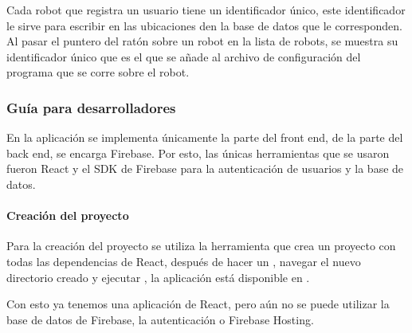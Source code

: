 Cada robot que registra un usuario tiene un identificador único, este identificador
le sirve para escribir en las ubicaciones den la base de datos que le corresponden.
Al pasar el puntero del ratón sobre un robot en la lista de robots, se muestra
su identificador único que es el que se añade al archivo de configuración
del programa que se corre sobre el robot.


\subsubsection{Guía para desarrolladores}
\label{\detokenize{code_docs:documentacion-para-desarrolladores}}\label{\detokenize{code_docs::doc}}
En la aplicación se implementa únicamente la parte del front end, de la parte
del back end, se encarga Firebase. Por esto, las únicas herramientas que se
usaron fueron React y el SDK de Firebase para la autenticación de usuarios y la base
de datos.


\paragraph{Creación del proyecto}
\label{\detokenize{code_docs:creacion-del-proyecto}}
Para la creación del proyecto se utiliza la herramienta 
que crea un proyecto con todas las dependencias de React, después de hacer un
, navegar el nuevo directorio creado y
ejecutar , la aplicación está disponible en .

Con esto ya tenemos una aplicación de React, pero aún no se puede
utilizar la base de datos de Firebase, la autenticación o Firebase Hosting.

